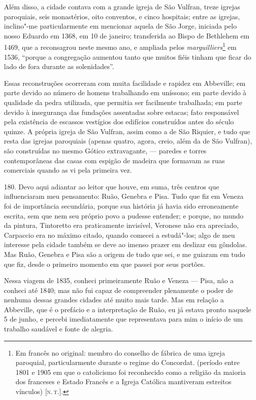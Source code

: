 Além disso, a cidade contava com a grande igreja de São Vulfran, treze
igrejas paroquiais, seis monastérios, oito conventos, e cinco hospitais;
entre as igrejas, inclino"-me particularmente em mencionar aquela de São
Jorge, iniciada pelo nosso Eduardo em 1368, em 10 de janeiro;
transferida ao Bispo de Bethlehem em 1469, que a reconsagrou neste mesmo
ano, e ampliada pelos \emph{marguilliers}\footnote{Em francês no
  original: membro do conselho de fábrica de uma igreja paroquial,
  particularmente durante o regime do Concordat. (período entre 1801 e
  1905 em que o catolicismo foi reconhecido como a religião da maioria
  dos franceses e Estado Francês e a Igreja Católica mantiveram
  estreitos vínculos) {[}\textsc{n.\,t.}{]}.} em 1536, ``porque a congregação
aumentou tanto que muitos fiéis tinham que ficar do lado de fora durante
as solenidades''.

Essas reconstruções ocorreram com muita facilidade e rapidez em
Abbeville; em parte devido ao número de homens trabalhando em uníssono;
em parte devido à qualidade da pedra utilizada, que permitia ser
facilmente trabalhada; em parte devido à insegurança das fundações
assentadas sobre estacas; fato responsável pela existência de escassos
vestígios dos edifícios construídos antes do século quinze. A própria
igreja de São Vulfran, assim como a de São Riquier, e tudo que resta das
igrejas paroquiais (apenas quatro, agora, creio, além da de São
Vulfran), são construídas no mesmo Gótico extravagante, --- paredes e
torres contemporâneas das casas com espigão de madeira que formavam as
ruas comerciais quando as vi pela primeira vez.

180. Devo aqui adiantar ao leitor que houve, em suma, três centros que
influenciaram meu pensamento: Ruão, Genebra e Pisa. Tudo que fiz em
Veneza foi de importância secundária, porque sua história já havia sido
erroneamente escrita, sem que nem seu próprio povo a pudesse entender; e
porque, no mundo da pintura, Tintoretto era praticamente invisível,
Veronese não era apreciado, Carpaccio era no máximo citado, quando
comecei a estudá"-los; algo de meu interesse pela cidade também se deve
ao imenso prazer em deslizar em gôndolas. Mas Ruão, Genebra e Pisa são a
origem de tudo que sei, e me guiaram em tudo que fiz, desde o primeiro
momento em que passei por seus portões.

Nessa viagem de 1835, conheci primeiramente Ruão e Veneza --- Pisa, não a
conheci até 1840; mas não fui capaz de compreender plenamente o poder de
nenhuma dessas grandes cidades até muito mais tarde. Mas em relação a
Abbeville, que é o prefácio e a interpretação de Ruão, eu já estava
pronto naquele 5 de junho, e percebi imediatamente que representava para
mim o início de um trabalho saudável e fonte de alegria.

